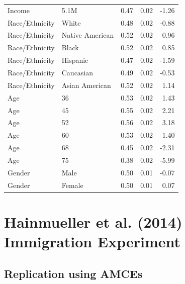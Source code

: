 \documentclass[a4paper,12pt]{article}\usepackage[]{graphicx}\usepackage[]{color}
\begin{document}
\begin{table}[ht]
\begin{tabular}{lp{3in}rrr}
  Income & 5.1M & 0.47 & 0.02 & -1.26 \\ 
  Race/Ethnicity & White & 0.48 & 0.02 & -0.88 \\ 
  Race/Ethnicity & Native American & 0.52 & 0.02 & 0.96 \\ 
  Race/Ethnicity & Black & 0.52 & 0.02 & 0.85 \\ 
  Race/Ethnicity & Hispanic & 0.47 & 0.02 & -1.59 \\ 
  Race/Ethnicity & Caucasian & 0.49 & 0.02 & -0.53 \\ 
  Race/Ethnicity & Asian American & 0.52 & 0.02 & 1.14 \\ 
  Age & 36 & 0.53 & 0.02 & 1.43 \\ 
  Age & 45 & 0.55 & 0.02 & 2.21 \\ 
  Age & 52 & 0.56 & 0.02 & 3.18 \\ 
  Age & 60 & 0.53 & 0.02 & 1.40 \\ 
  Age & 68 & 0.45 & 0.02 & -2.31 \\ 
  Age & 75 & 0.38 & 0.02 & -5.99 \\ 
  Gender & Male & 0.50 & 0.01 & -0.07 \\ 
  Gender & Female & 0.50 & 0.01 & 0.07 \\ 
   \hline
\end{tabular}
\endgroup
\end{table}


\clearpage

\section{Hainmueller et al. (2014) Immigration Experiment}

\subsection{Replication using AMCEs}
\end{document}
